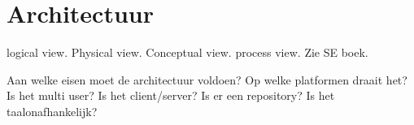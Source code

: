 
\section{Architectuur}

logical view. Physical view. Conceptual view. process view. Zie SE boek.

Aan welke eisen moet de architectuur voldoen?
Op welke platformen draait het?
Is het multi user? Is het client/server? Is er een repository?
Is het taalonafhankelijk?
